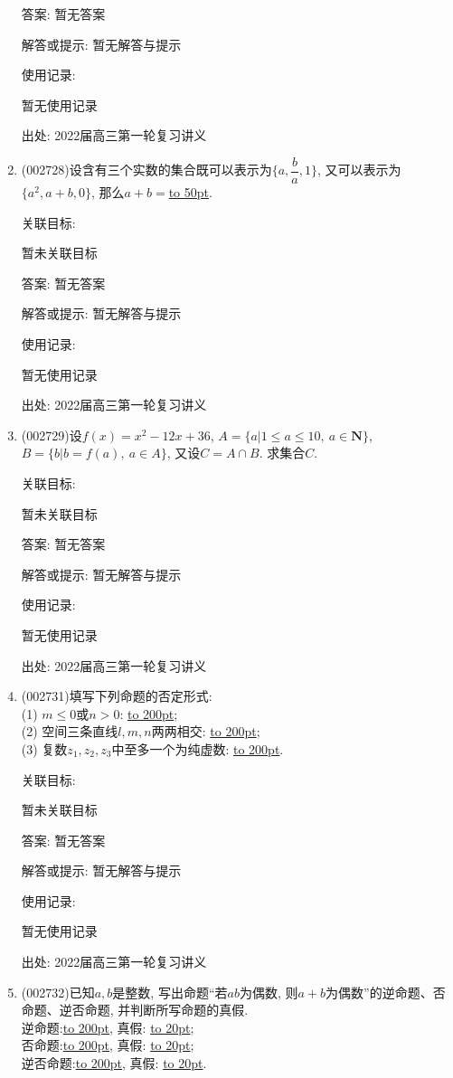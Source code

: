 \documentclass[10pt,a4paper]{article}
\newcommand{\blank}[1]{\underline{\hbox to #1pt{}}}
\begin{document}
\begin{enumerate}[1.]
答案: 暂无答案

解答或提示: 暂无解答与提示

使用记录:

暂无使用记录


出处: 2022届高三第一轮复习讲义
\item { (002728)}设含有三个实数的集合既可以表示为$\{a,\dfrac ba,1\}$, 又可以表示为$\{a^2,a+b,0\}$, 那么$a+b=$\blank{50}.


关联目标:

暂未关联目标

答案: 暂无答案

解答或提示: 暂无解答与提示

使用记录:

暂无使用记录


出处: 2022届高三第一轮复习讲义
\item { (002729)}设$f(x)=x^2-12x+36$, $A=\{a|1\le a\le 10, \ a\in \mathbf{N}\}$, $B=\{b|b=f(a),\ a\in A\}$, 又设$C=A\cap B$. 求集合$C$.


关联目标:

暂未关联目标

答案: 暂无答案

解答或提示: 暂无解答与提示

使用记录:

暂无使用记录


出处: 2022届高三第一轮复习讲义
\item { (002731)}填写下列命题的否定形式:\\
(1) $m\le 0$或$n>0$: \blank{200};\\
(2) 空间三条直线$l,m,n$两两相交: \blank{200};\\
(3) 复数$z_1,z_2,z_3$中至多一个为纯虚数: \blank{200}.


关联目标:

暂未关联目标

答案: 暂无答案

解答或提示: 暂无解答与提示

使用记录:

暂无使用记录


出处: 2022届高三第一轮复习讲义
\item { (002732)}已知$a,b$是整数, 写出命题``若$ab$为偶数, 则$a+b$为偶数''的逆命题、否命题、逆否命题, 并判断所写命题的真假.\\
逆命题:\blank{200}, 真假: \blank{20};\\
否命题:\blank{200}, 真假: \blank{20};\\
逆否命题:\blank{200}, 真假: \blank{20}.



\end{enumerate}
\end{document}
